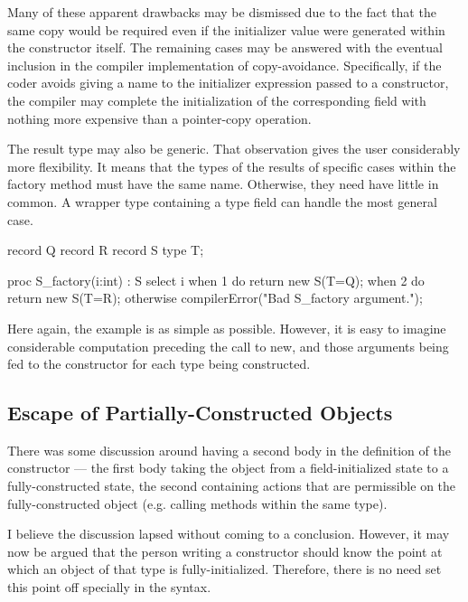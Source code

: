 Many of these apparent drawbacks may be dismissed due to the fact that the same copy would
be required even if the initializer value were generated within the constructor itself.
The remaining cases may be answered with the eventual inclusion in the compiler
implementation of copy-avoidance.  Specifically, if the coder avoids giving a name to the
initializer expression passed to a constructor, the compiler may complete the
initialization of the corresponding field with nothing more expensive than a pointer-copy
operation.

\vspace{6pt}

The result type may also be generic.  That observation gives the user considerably more
flexibility.  It means that the types of the results of specific cases within the factory
method must have the same name.  Otherwise, they need have little in common.  A wrapper
type containing a type field can handle the most general case.

\begin{chapel}
record Q { }
record R { }
record S { type T; }

proc S_factory(i:int) : S {
  select i {
    when 1 do return new S(T=Q);
    when 2 do return new S(T=R);
    otherwise compilerError("Bad S_factory argument.");
  }
}
\end{chapel}
\noindent
Here again, the example is as simple as possible.  However, it is easy to imagine
considerable computation preceding the call to new, and those arguments being fed to the
constructor for each type being constructed.

\subsection{Escape of Partially-Constructed Objects}

There was some discussion around having a second body in the definition of the constructor
--- the first body taking the object from a field-initialized state to a
fully-constructed state, the second containing actions that are permissible on the
fully-constructed object (e.g. calling methods within the same type).

I believe the discussion lapsed without coming to a conclusion.  However, it may now be
argued that the person writing a constructor should know the point at which an object of
that type is fully-initialized.  Therefore, there is no need set this point off specially
in the syntax.  

